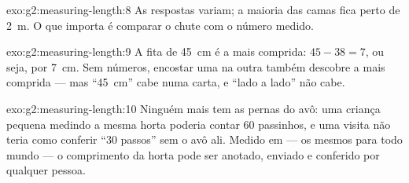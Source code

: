 \begin{solution}{exo:g2:measuring-length:8}
As respostas variam; a maioria das camas fica perto de \qty{2}{m}. O
que importa é comparar o chute com o número medido.
\end{solution}

\begin{solution}{exo:g2:measuring-length:9}
A fita de \qty{45}{cm} é a mais comprida: $45 - 38 = 7$, ou seja, por
\qty{7}{cm}. Sem números, encostar uma na outra também descobre a
mais comprida --- mas ``\qty{45}{cm}'' cabe numa carta, e ``lado a
lado'' não cabe.
\end{solution}

\begin{solution}{exo:g2:measuring-length:10}
Ninguém mais tem as pernas do avô: uma criança pequena medindo a
mesma horta poderia contar $60$ passinhos, e uma visita não teria
como conferir ``$30$ passos'' sem o avô ali. Medido em  --- os
mesmos para todo mundo --- o comprimento da horta pode ser anotado,
enviado e conferido por qualquer pessoa.
\end{solution}

